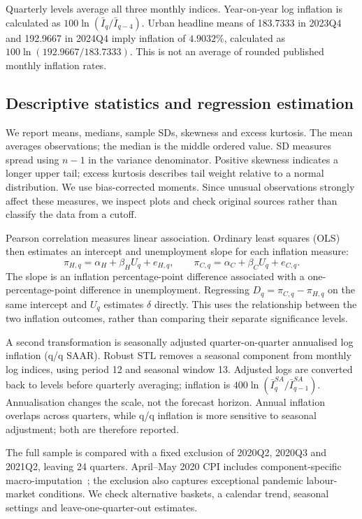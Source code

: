 \documentclass[10pt,a4paper]{article}
\begin{document}
Quarterly levels average all three monthly indices. Year-on-year log inflation is calculated as $100\ln(\bar I_q/\bar I_{q-4})$.
Urban headline means of 183.7333 in 2023Q4 and 192.9667 in 2024Q4 imply inflation of $4.9032\%$, calculated as $100\ln(192.9667/183.7333)$. This is not an average of rounded published monthly inflation rates.

\subsection{Descriptive statistics and regression estimation}

We report means, medians, sample SDs, skewness and excess kurtosis. The mean averages observations; the median is the middle ordered value. SD measures spread using $n-1$ in the variance denominator. Positive skewness indicates a longer upper tail; excess kurtosis describes tail weight relative to a normal distribution. We use bias-corrected moments. Since unusual observations strongly affect these measures, we inspect plots and check original sources rather than classify the data from a cutoff.

Pearson correlation measures linear association. Ordinary least squares (OLS) then estimates an intercept and unemployment slope for each inflation measure:
\begin{equation}
\pi_{H,q}=\alpha_H+\beta_H U_q+e_{H,q},\qquad
\pi_{C,q}=\alpha_C+\beta_C U_q+e_{C,q}.
\label{eq:reg}
\end{equation}
The slope is an inflation percentage-point difference associated with a one-percentage-point difference in unemployment. Regressing $D_q=\pi_{C,q}-\pi_{H,q}$ on the same intercept and $U_q$ estimates $\delta$ directly. This uses the relationship between the two inflation outcomes, rather than comparing their separate significance levels.

\newpage
A second transformation is seasonally adjusted quarter-on-quarter annualised log inflation (q/q SAAR). Robust STL removes a seasonal component from monthly log indices, using period 12 and seasonal window 13. Adjusted logs are converted back to levels before quarterly averaging; inflation is $400\ln(\bar I_q^{SA}/\bar I_{q-1}^{SA})$. Annualisation changes the scale, not the forecast horizon. Annual inflation overlaps across quarters, while q/q inflation is more sensitive to seasonal adjustment; both are therefore reported.

The full sample is compared with a fixed exclusion of 2020Q2, 2020Q3 and 2021Q2, leaving 24 quarters. April--May 2020 CPI includes component-specific macro-imputation~\cite{imputation}; the exclusion also captures exceptional pandemic labour-market conditions. We check alternative baskets, a calendar trend, seasonal settings and leave-one-quarter-out estimates.
\end{document}
